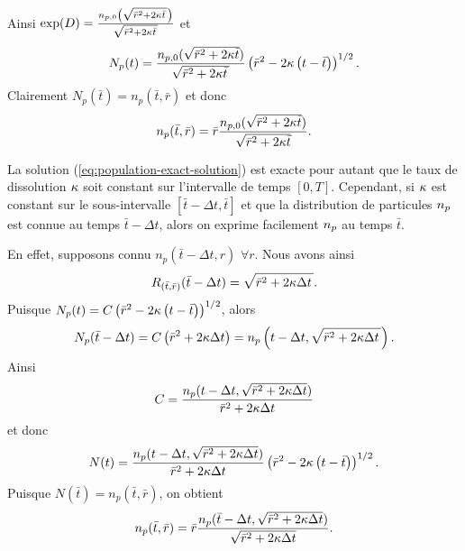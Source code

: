 Ainsi
$\exp(D) = \frac{n_{p,0}\left( \sqrt{\bar r^2 + 2\kappa \bar t\,} \right)}{\sqrt{\bar r^2 + 2\kappa \bar t\,}}$
et
\begin{equation*}
  N_p(t) = \frac{n_{p,0}(\sqrt{\bar r^2 + 2\kappa \bar
      t})}{\sqrt{\bar r^2 + 2\kappa \bar t\,}}\left( \bar r^2 -
    2\kappa \left( t - \bar t \right) \right)^{1/2}.
\end{equation*}
Clairement
$N_p(\bar t) = n_p(\bar t, \bar r)$
et donc
\begin{equation}\label{eq:population-exact-solution}
  n_p(\bar t, \bar r) = \bar r\frac{n_{p,0}(\sqrt{\bar r^2 +
      2\kappa \bar t})}{\sqrt{\bar r^2+2\kappa \bar t}}.
\end{equation}

\begin{remarque}\label{rem:population-exact-step}
  La solution (\ref{eq:population-exact-solution}) est exacte pour
  autant que le taux de dissolution $\kappa$ soit constant
  sur l'intervalle de temps $[0, T]$. Cependant, si $\kappa$
  est constant sur le sous-intervalle $[\bar t - \Delta t, \bar t]$ et
  que la distribution de particules $n_p$ est connue au temps
  $\bar t - \Delta t$, alors on exprime facilement $n_p$ au
  temps $\bar t$.

  En effet, supposons connu $n_p(\bar t - \Delta t, r)$ $\forall
  r$. Nous avons ainsi
  \begin{equation*}
    R_{(\bar t, \bar r)}(\bar t - \Delta t) = \sqrt{\bar r^2 +
      2\kappa \Delta t\,}.
  \end{equation*}
  Puisque $N_p(t) = C\left( \bar r^2 - 2\kappa\left( t -
      \bar t \right) \right)^{1/2}$, alors
  \begin{equation*}
N_p(\bar t - \Delta t) = C\left( \bar r^2 + 2\kappa \Delta
  t \right) = n_p\left( t - \Delta t, \sqrt{\bar r^2 + 2\kappa
    \Delta t\,} \right).
  \end{equation*}
  Ainsi
  \begin{equation*}
    C = \frac{n_p(t - \Delta t, \sqrt{\bar r^2 + 2\kappa
        \Delta t})}{\bar r^2 + 2\kappa\Delta t}
  \end{equation*}
  et donc
  \begin{equation*}
    N(t) = \frac{n_p(t - \Delta t, \sqrt{\bar r^2 + 2\kappa
        \Delta t})}{\bar r^2 + 2\kappa\Delta t}\left( \bar
      r^2 - 2\kappa\left( t - \bar t \right) \right)^{1/2}.
  \end{equation*}
  Puisque $N(\bar t) = n_p(\bar t, \bar r)$, on obtient
  \begin{equation*}
    n_p(\bar t, \bar r) = \bar r\frac{n_p(\bar t - \Delta t, \sqrt{\bar
        r^2 + 2\kappa \Delta t})}{\sqrt{\bar r^2 +
        2\kappa \Delta t}}.
  \end{equation*}
\end{remarque}

